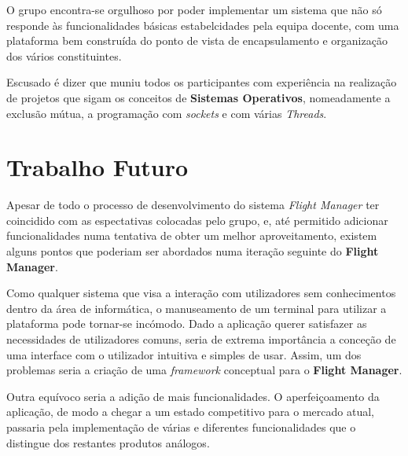 \documentclass[a4paper,11pt]{scrreprt}
\begin{document}
O grupo encontra-se orgulhoso por poder implementar um sistema que não só responde às funcionalidades 
básicas estabelcidades pela equipa docente, com uma plataforma bem construída do ponto de vista
de encapsulamento e organização dos vários constituintes.

Escusado é dizer que muniu todos os participantes com experiência na realização de projetos que sigam 
os conceitos de \textbf{Sistemas Operativos}, nomeadamente a exclusão mútua, a programação com \textit{sockets} e
com várias \textit{Threads}.

\section{Trabalho Futuro}

Apesar de todo o processo de desenvolvimento do sistema \textit{Flight Manager} ter coincidido com as espectativas
colocadas pelo grupo, e, até permitido adicionar funcionalidades numa tentativa de obter um melhor aproveitamento,
existem alguns pontos que poderiam ser abordados numa iteração seguinte do \textbf{Flight Manager}.

Como qualquer sistema que visa a interação com utilizadores sem conhecimentos dentro da área de informática, o 
manuseamento de um terminal para utilizar a plataforma pode tornar-se incómodo.
Dado a aplicação querer satisfazer as necessidades de utilizadores comuns, seria de extrema importância a conceção
de uma interface com o utilizador intuitiva e simples de usar.
Assim, um dos problemas seria a criação de uma \textit{framework} conceptual para o \textbf{Flight Manager}.

Outra equívoco seria a adição de mais funcionalidades. 
O aperfeiçoamento da aplicação, de modo a chegar a um estado competitivo para o mercado atual, passaria pela
implementação de várias e diferentes funcionalidades que o distingue dos restantes produtos análogos.


\printbibliography

\renewcommand{\nomname}{Lista de Siglas e Acrónimos}

\renewcommand{\nompreamble}{}

\end{document}
